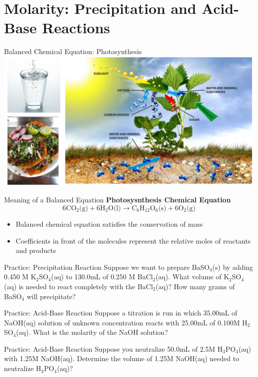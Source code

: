 \documentclass[11pt]{beamer}
\begin{document}
\section{Molarity: Precipitation and Acid-Base Reactions}

\begin{frame}{Balanced Chemical Equation: Photosynthesis}
  \centering
  \includegraphics[trim={8in 0 0 0},clip,width=1\linewidth]{food_pic}
\end{frame}

\begin{frame}{Meaning of a Balanced Equation}
  \textbf{Photosysnthesis Chemical Equation}
  \begin{equation}
    6\text{CO$_2$(g)} + 6\text{H$_2$O(l)} \rightarrow \text{C$_6$H$_{12}$O$_6$(s)}
    + 6\text{O$_2$(g)}
  \end{equation}
  
  \begin{itemize}
  \item Balanced chemical equation satisfies the conservation of mass
  \item Coefficients in front of the molecules represent the relative
    moles of reactants and products
  \end{itemize}
\end{frame}

\begin{frame}{Practice: Precipitation Reaction}
  Suppose we want to prepare BaSO$_4$(s) by adding 0.450 M K$_2$SO$_4$(aq) to
  130.0mL of 0.250 M BaCl$_2$(aq). What volume of K$_2$SO$_4$(aq) is needed
  to react completely with the BaCl$_2$(aq)? How many grams of BaSO$_4$ will
  precipitate?
  \vspace{1.5in}
\end{frame}

\begin{frame}{Practice: Acid-Base Reaction}
  Suppose a titration is run in which 35.00mL of NaOH(aq) solution of unknown
  concentration reacts with 25.00mL of 0.100M H$_2$SO$_4$(aq). What is
  the molarity of the NaOH solution?
  \vspace{1.5in}
\end{frame}

\begin{frame}{Practice: Acid-Base Reaction}
  Suppose you neutralize 50.0mL of 2.5M H$_3$PO$_4$(aq) with 1.25M NaOH(aq).
  Determine the volume of 1.25M NaOH(aq) needed to neutralize H$_3$PO$_4$(aq)?
  \vspace{1.5in}
\end{frame}
\end{document}
